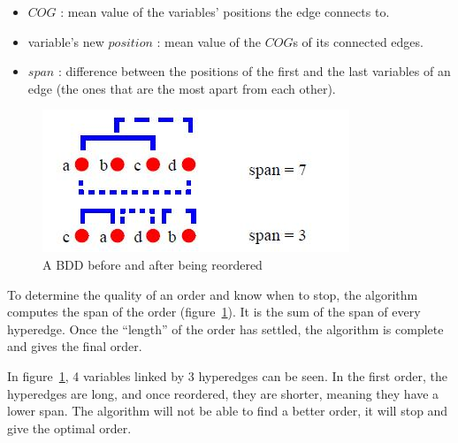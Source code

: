 \documentclass[12pt]{report}
\begin{document}
\begin{itemize}
  \item $COG$ : mean value of the variables' positions the edge connects to.
  \item variable's new $position$ : mean value of the $COG$s of its connected edges.
  \item $span$ : difference between the positions of the first and the last variables of an edge (the ones that are the most apart from each other).
\end{itemize}

\begin{algorithm}[!h]
\begin{algorithmic}[1]
  \Repeat
    \EndFor
    \EndFor
\EndFunction
\label{force}
\end{algorithmic}
\end{algorithm}

\begin{figure}[!h]
  \centering
  \includegraphics[scale=0.7]{images/force_span.jpg}
  \caption{A BDD before and after being reordered}
  \label{force_span}
\end{figure}

To determine the quality of an order and know when to stop, the algorithm computes the span of the order (figure~\ref{force_span}). It is the sum of the span of every hyperedge. Once the \enquote{length} of the order has settled, the algorithm is complete and gives the final order.

In figure~\ref{force_span}, 4 variables linked by 3 hyperedges can be seen. In the first order, the hyperedges are long, and once reordered, they are shorter, meaning they have a lower span. The algorithm will not be able to find a better order, it will stop and give the optimal order.
\end{document}
